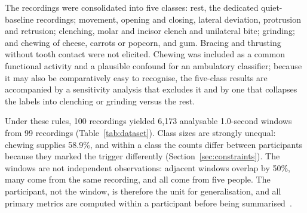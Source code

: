 \documentclass[pdflatex,sn-nature,iicol]{sn-jnl}
\begin{document}
The recordings were consolidated into five classes: rest, the dedicated quiet-baseline recordings; movement, opening and closing, lateral deviation, protrusion and retrusion; clenching, molar and incisor clench and unilateral bite; grinding; and chewing of cheese, carrots or popcorn, and gum. Bracing and thrusting without tooth contact were not elicited. Chewing was included as a common functional activity and a plausible confound for an ambulatory classifier; because it may also be comparatively easy to recognise, the five-class results are accompanied by a sensitivity analysis that excludes it and by one that collapses the labels into clenching or grinding versus the rest.

Under these rules, 100 recordings yielded 6,173 analysable 1.0-second windows from 99 recordings (Table~\ref{tab:dataset}). Class sizes are strongly unequal: chewing supplies 58.9\%, and within a class the counts differ between participants because they marked the trigger differently (Section~\ref{sec:constraints}). The windows are not independent observations: adjacent windows overlap by 50\%, many come from the same recording, and all come from five people. The participant, not the window, is therefore the unit for generalisation, and all primary metrics are computed within a participant before being summarised~\cite{saeb2017need,little2017using,roberts2017cross}.
\end{document}

